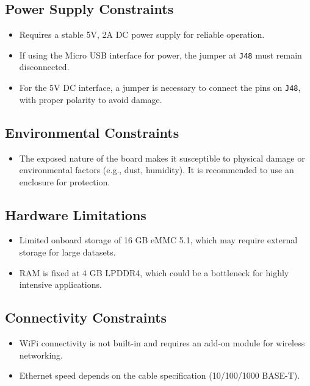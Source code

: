 \subsection{Power Supply Constraints}
\begin{itemize}[leftmargin=1.5cm]
	\item Requires a stable 5V, 2A DC power supply for reliable operation.
	\item If using the Micro USB interface for power, the jumper at \texttt{J48} must remain disconnected.
	\item For the 5V DC interface, a jumper is necessary to connect the pins on \texttt{J48}, with proper polarity to avoid damage.
\end{itemize}

\subsection{Environmental Constraints}
\begin{itemize}[leftmargin=1.5cm]
	\item The exposed nature of the board makes it susceptible to physical damage or environmental factors (e.g., dust, humidity). It is recommended to use an enclosure for protection.
\end{itemize}

\subsection{Hardware Limitations}
\begin{itemize}[leftmargin=1.5cm]
	\item Limited onboard storage of 16 GB eMMC 5.1, which may require external storage for large datasets.
	\item RAM is fixed at 4 GB LPDDR4, which could be a bottleneck for highly intensive applications.
\end{itemize}

\subsection{Connectivity Constraints}
\begin{itemize}[leftmargin=1.5cm]
	\item WiFi connectivity is not built-in and requires an add-on module for wireless networking.
	\item Ethernet speed depends on the cable specification (10/100/1000 BASE-T).
\end{itemize}

